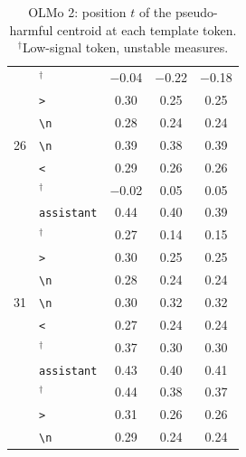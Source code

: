 \begin{table}[!htbp]
\begin{tabular}{llccc}
 & \texttt{\textbar{}}$^{\dagger}$ & $-$0.04 & $-$0.22 & $-$0.18 \\
 & \texttt{\textgreater{}} & 0.30 & 0.25 & 0.25 \\
 & \texttt{\textbackslash n} & 0.28 & 0.24 & 0.24 \\
\midrule
26 & \texttt{\textbackslash n} & 0.39 & 0.38 & 0.39 \\
 & \texttt{\textless{}} & 0.29 & 0.26 & 0.26 \\
 & \texttt{\textbar{}}$^{\dagger}$ & $-$0.02 & 0.05 & 0.05 \\
 & \texttt{assistant} & 0.44 & 0.40 & 0.39 \\
 & \texttt{\textbar{}}$^{\dagger}$ & 0.27 & 0.14 & 0.15 \\
 & \texttt{\textgreater{}} & 0.30 & 0.25 & 0.25 \\
 & \texttt{\textbackslash n} & 0.28 & 0.24 & 0.24 \\
\midrule
31 & \texttt{\textbackslash n} & 0.30 & 0.32 & 0.32 \\
 & \texttt{\textless{}} & 0.27 & 0.24 & 0.24 \\
 & \texttt{\textbar{}}$^{\dagger}$ & 0.37 & 0.30 & 0.30 \\
 & \texttt{assistant} & 0.43 & 0.40 & 0.41 \\
 & \texttt{\textbar{}}$^{\dagger}$ & 0.44 & 0.38 & 0.37 \\
 & \texttt{\textgreater{}} & 0.31 & 0.26 & 0.26 \\
 & \texttt{\textbackslash n} & 0.29 & 0.24 & 0.24 \\
\bottomrule
\end{tabular}
\caption{OLMo 2: position $t$ of the pseudo-harmful centroid at each template token. $^{\dagger}$Low-signal token, unstable measures.}
\label{tab:centroid_template_olmo2}
\end{table}
